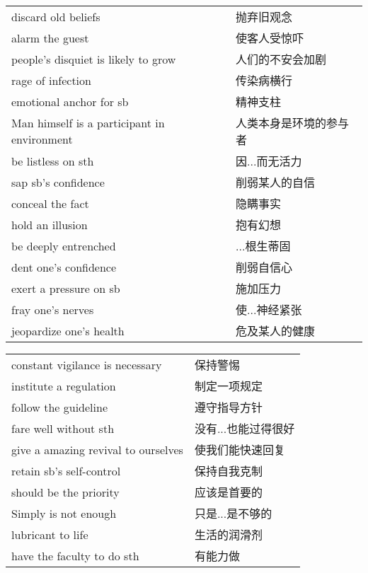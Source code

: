 \begin{tabular}{ll}
    discard old beliefs                         & 抛弃旧观念       \\
    alarm the guest                             & 使客人受惊吓      \\
    people's disquiet is likely to grow         & 人们的不安会加剧    \\
    rage of infection                           & 传染病横行       \\
    emotional anchor for sb                     & 精神支柱        \\
    Man himself is a participant in environment & 人类本身是环境的参与者 \\
    be listless on sth                          & 因...而无活力    \\
    sap sb's confidence                         & 削弱某人的自信     \\
    conceal the fact                            & 隐瞒事实        \\
    hold an illusion                            & 抱有幻想        \\
    be deeply entrenched                        & ...根生蒂固     \\
    dent one's confidence                       & 削弱自信心       \\
    exert a pressure on sb                      & 施加压力        \\
    fray one's nerves                           & 使...神经紧张    \\
    jeopardize one's health                     & 危及某人的健康     \\
\end{tabular}

\begin{tabular}{ll}
    constant vigilance is necessary     & 保持警惕        \\
    institute a regulation              & 制定一项规定      \\
    follow the guideline                & 遵守指导方针      \\
    fare well without sth               & 没有...也能过得很好 \\
    give a amazing revival to ourselves & 使我们能快速回复    \\
    retain sb's self-control            & 保持自我克制      \\
    should be the priority              & 应该是首要的      \\
    Simply is not enough                & 只是...是不够的   \\
    lubricant to life                   & 生活的润滑剂      \\
    have the faculty to do sth          & 有能力做        \\
\end{tabular}

